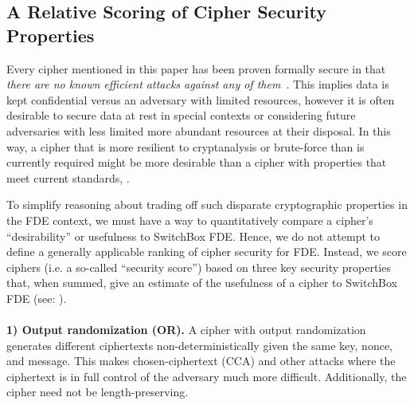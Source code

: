 \subsection{A Relative Scoring of Cipher Security Properties}

Every cipher mentioned in this paper has been proven formally secure in that
\emph{there are no known efficient attacks against any of them}~\cite{All,
Ciphers, Again}. This implies data is kept confidential versus an adversary with
limited resources, however it is often desirable to secure data at rest in
special contexts or considering future adversaries with less limited more
abundant resources at their disposal. In this way, a cipher that is more
resilient to cryptanalysis or brute-force than is currently required might be
more desirable than a cipher with properties that meet current standards,
.

To simplify reasoning about trading off such disparate cryptographic properties
in the FDE context, we must have a way to quantitatively compare a cipher's
``desirability'' or usefulness to SwitchBox FDE. Hence, we do not attempt to
define a generally applicable ranking of cipher security for FDE. Instead, we
score ciphers (i.e. a so-called ``security score'') based on three key security
properties that, when summed, give an estimate of the usefulness of a cipher to
SwitchBox FDE (see: ).\\
\\
\textbf{1) Output randomization (OR).} A cipher with output randomization
generates different ciphertexts non-deterministically given the same key, nonce,
and message. This makes chosen-ciphertext (CCA) and other attacks where the
ciphertext is in full control of the adversary much more difficult.
Additionally, the cipher need not be length-preserving.

